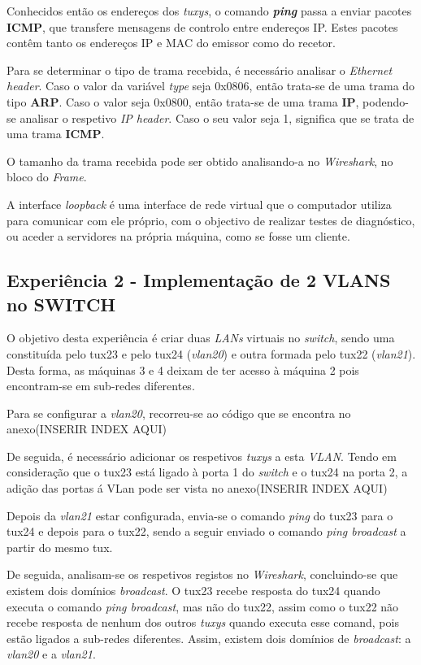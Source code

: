 \documentclass[11pt]{article}
\begin{document}
Conhecidos então os endereços dos \textit{tuxys}, o comando \textit{\textbf{ping}} passa a enviar pacotes \textbf{ICMP}, que transfere mensagens de controlo entre endereços IP. Estes pacotes contêm tanto os endereços IP e MAC do emissor como do recetor.

Para se determinar o tipo de trama recebida, é necessário analisar o \textit{Ethernet header}. Caso o valor da variável \textit{type} seja 0x0806, então trata-se de uma trama do tipo \textbf{ARP}. Caso o valor seja 0x0800, então trata-se de uma trama \textbf{IP}, podendo-se analisar o respetivo \textit{IP header}. Caso o seu valor seja 1, significa que se trata de uma trama \textbf{ICMP}.

O tamanho da trama recebida pode ser obtido analisando-a no \textit{Wireshark}, no bloco do \textit{Frame}.

A interface \textit{loopback} é uma interface de rede virtual que o computador utiliza para comunicar com ele próprio, com o objectivo de realizar testes de diagnóstico, ou aceder a servidores na própria máquina, como se fosse um cliente.

\subsection{Experiência 2 - Implementação de 2 VLANS no SWITCH}

O objetivo desta experiência é criar duas \textit{LANs} virtuais no \textit{switch}, sendo uma constituída pelo tux23 e pelo tux24 (\textit{vlan20}) e outra formada pelo tux22 (\textit{vlan21}). Desta forma, as máquinas 3 e 4 deixam de ter acesso à máquina 2 pois encontram-se em sub-redes diferentes.

Para se configurar a \textit{vlan20}, recorreu-se ao código que se encontra no anexo(INSERIR INDEX AQUI) 

De seguida, é necessário adicionar os respetivos \textit{tuxys} a esta \textit{VLAN}. Tendo em consideração que o tux23 está ligado à porta 1 do \textit{switch} e o tux24 na porta 2, a adição das portas á VLan pode ser vista no anexo(INSERIR INDEX AQUI) 

Depois da \textit{vlan21} estar configurada, envia-se o comando \textit{ping} do tux23 para o tux24 e depois para o tux22, sendo a seguir enviado o comando \textit{ping broadcast} a partir do mesmo tux.

De seguida, analisam-se os respetivos registos no \textit{Wireshark}, concluindo-se que existem dois domínios \textit{broadcast}. O tux23 recebe resposta do tux24 quando executa o comando \textit{ping broadcast}, mas não do tux22, assim como o tux22 não recebe resposta de nenhum dos outros \textit{tuxys} quando executa esse comand, pois estão ligados a sub-redes diferentes. Assim, existem dois domínios de \textit{broadcast}: a \textit{vlan20} e a \textit{vlan21}. 
\end{document}
